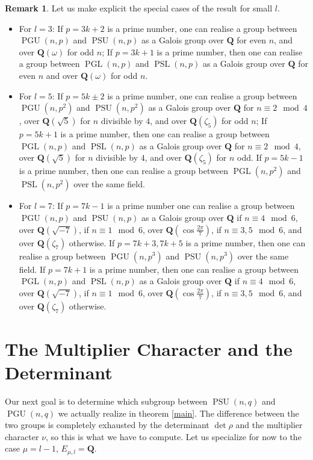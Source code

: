 \documentclass{article}
\theoremstyle{definition}
\newtheorem*{remark}{Remark}
\DeclareMathOperator{\PGL}{\mathrm{PGL}}
\DeclareMathOperator{\PGU}{\mathrm{PGU}}
\DeclareMathOperator{\PSL}{\mathrm{PSL}}
\DeclareMathOperator{\PSU}{\mathrm{PSU}}
\begin{document}
	 \begin{remark}
	 	Let us make explicit the special cases of the result for small $l$.
	 	\begin{itemize}
	 		\item For $l=3$: If $p=3k+2$ is a prime number, one can realise a group between $\PGU(n,p)$ and $\PSU(n,p)$ as a Galois group over $\mathbf{Q}$ for even $n$, and over $\mathbf{Q}(\omega)$ for odd $n$;  If $p=3k+1$ is a prime number, then one can realise a group between $\PGL(n,p)$ and $\PSL(n,p)$ as a Galois group over $\mathbf{Q}$ for even $n$ and over $\mathbf{Q}(\omega)$ for odd $n$.
	 		\item For $l=5$: If $p=5k \pm 2$ is a prime number, one can realise a group between $\PGU(n,p^2)$ and $\PSU(n,p^2)$ as a Galois group over $\mathbf{Q}$ for $n \equiv 2 \mod 4$, over $\mathbf{Q}(\sqrt{5})$ for $n$ divisible by $4$, and over $\mathbf{Q}(\zeta_5)$ for odd $n$; If $p=5k+1$ is a prime number, then one can realise a group between $\PGL(n,p)$ and $\PSL(n,p)$ as a Galois group over $\mathbf{Q}$ for $n \equiv 2 \mod 4$, over $\mathbf{Q}(\sqrt{5})$ for $n$ divisible by $4$, and over $\mathbf{Q}(\zeta_5)$ for $n$ odd. If $p=5k-1$ is a prime number, then one can realise a group between $\PGL(n,p^2)$ and $\PSL(n,p^2)$ over the same field.
	 		\item For $l=7$: If $p=7k-1$ is a prime number one can realise a group between $\PGU(n,p)$ and $\PSU(n,p)$ as a Galois group over $\mathbf{Q}$ if $n \equiv 4 \mod 6$, over $\mathbf{Q}(\sqrt{-7})$, if $n \equiv 1 \mod 6$, over $\mathbf{Q}(\cos \frac{2 \pi}{7})$, if $n \equiv 3,5 \mod 6$, and over $\mathbf{Q}(\zeta_7)$ otherwise. If $p=7k+3,7k+5$ is a prime number, then one can realise a group between $\PGU(n,p^3)$ and $\PSU(n,p^3)$ over the same field. If $p=7k+1$ is a prime number, then one can realise a group between $\PGL(n,p)$ and $\PSL(n,p)$ as a Galois group over $\mathbf{Q}$ if $n \equiv 4 \mod 6$, over $\mathbf{Q}(\sqrt{-7})$, if $n \equiv 1 \mod 6$, over $\mathbf{Q}(\cos \frac{2 \pi}{7})$, if $n \equiv 3,5 \mod 6$, and over $\mathbf{Q}(\zeta_7)$ otherwise.
	 	\end{itemize}
	 \end{remark}
 	
 	\section{The Multiplier Character and the Determinant}
 	
 	Our next goal is to determine which subgroup between $\PSU(n,q)$ and $\PGU(n,q)$ we actually realize in theorem \ref{main}. The difference between the two groups is completely exhausted by the determinant $\det \rho$ and the multiplier character $\nu$, so this is what we have to compute. Let us specialize for now to the case $\mu = l-1$, $E_{\mu, l} = \mathbf{Q}$.
 	
\end{document}
